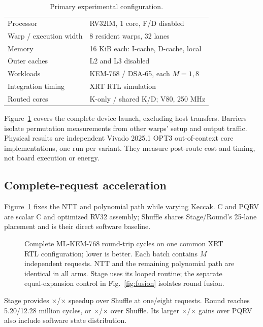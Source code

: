\documentclass[conference,letterpaper]{IEEEtran}
\begin{document}
\begin{table}[t]
\caption{Primary experimental configuration.}
\label{tab:setup}
\centering\small
\begin{tabular}{@{}ll@{}}
\toprule
Processor & RV32IM, 1 core, F/D disabled \\
Warp / execution width & 8 resident warps, 32 lanes \\
Memory & 16 KiB each: I-cache, D-cache, local \\
Outer caches & L2 and L3 disabled \\
Workloads & KEM-768 / DSA-65, each $M=1,8$ \\
Integration timing & XRT RTL simulation \\
Routed cores & K-only / shared K/D; V80, 250 MHz \\
\bottomrule
\end{tabular}
\end{table}

Figure~\ref{fig:kem} covers the complete device launch, excluding host
transfers. Barriers isolate permutation measurements from other warps'
setup and output traffic. Physical results are independent Vivado 2025.1
OPT3 out-of-context core implementations, one run per variant. They measure
post-route cost and timing, not board execution or energy.

\subsection{Complete-request acceleration}
Figure~\ref{fig:kem} fixes the NTT and polynomial path while varying Keccak.
C and PQRV are scalar C and optimized RV32 assembly; Shuffle shares
Stage/Round's 25-lane placement and is their direct software baseline.

\begin{figure}[t]
\centering
\caption{Complete ML-KEM-768 round-trip cycles on one common XRT RTL
configuration; lower is better. Each batch contains $M$ independent
requests. NTT and the remaining polynomial path are identical in all arms.
Stage uses its looped routine; the separate equal-expansion control in
Fig.~\ref{fig:fusion} isolates round fusion.}
\label{fig:kem}
\end{figure}

Stage provides \StageVsShuffleOne{}$\times$/\StageVsShuffleEight{}$\times$
speedup over Shuffle at one/eight requests. Round reaches 5.20/12.28 million
cycles, or \RoundVsShuffleOne{}$\times$/\RoundVsShuffleEight{}$\times$ over
Shuffle. Its larger \RoundVsPqrvOne{}$\times$/\RoundVsPqrvEight{}$\times$
gains over PQRV also include software state distribution.
\end{document}
